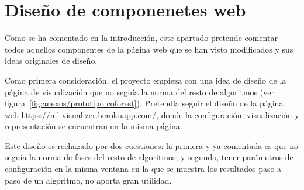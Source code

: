 \section{Diseño de componenetes web}
Como se ha comentado en la introducción, este apartado pretende comentar todos aquellos componentes de la página web que se han visto modificados y sus ideas originales de diseño.

Como primera consideración, el proyecto empieza con una idea de diseño de la página de visualización que no seguía la norma del resto de algoritmos (ver figura~\ref{fig:anexos/prototipo coforest}). Pretendía seguir el diseño de la página web \url{https://ml-visualizer.herokuapp.com/}, donde la configuración, visualización y representación se encuentran en la misma página.


Este diseño es rechazado por dos cuestiones: la primera y ya comentada es que no seguía la norma de fases del resto de algoritmos; y segundo, tener parámetros de configuración en la misma ventana en la que se muestra los resultados paso a paso de un algoritmo, no aporta gran utilidad.

